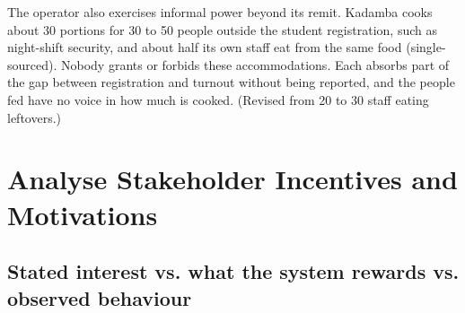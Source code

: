 \documentclass[
  10pt,
  table]{article}
\begin{document}
The operator also exercises informal power beyond its remit. Kadamba cooks about 30 portions for 30 to 50 people outside the student registration, such as night-shift security, and about half its own staff eat from the same food (single-sourced). Nobody grants or forbids these accommodations. Each absorbs part of the gap between registration and turnout without being reported, and the people fed have no voice in how much is cooked. (Revised from 20 to 30 staff eating leftovers.)

\section{Analyse Stakeholder Incentives and Motivations}\label{analyse-stakeholder-incentives-and-motivations}

\subsection{Stated interest vs. what the system rewards vs. observed behaviour}\label{stated-interest-vs.-what-the-system-rewards-vs.-observed-behaviour}
\end{document}
